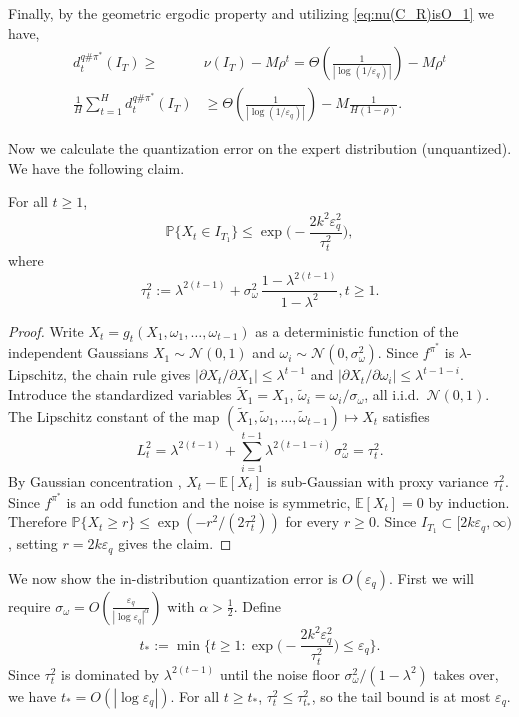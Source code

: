 \documentclass{article}
\begin{document}
Finally, by the geometric ergodic property and utilizing \cref{eq:nu(C_R)isO_1} we have,
\begin{align*}
    d^{q\#\pi^*}_t(I_T)\geq &\nu(I_T)-M\rho^t=\Theta(\frac{1}{|\log(1/\varepsilon_q)|})-M\rho^t\\
    \frac{1}{H}\sum_{t=1}^Hd^{q\#\pi^*}_t(I_T)&\geq \Theta(\frac{1}{|\log(1/\varepsilon_q)|}) - M\frac{1}{H(1-\rho)}.
\end{align*}

Now we calculate the quantization error on the expert distribution (unquantized). We have the following claim.


\begin{claim}\label{claim:tail_bound}
For all $t\ge 1$,
\begin{equation}\label{eq:geometric_decay_bound}
\mathbb P\{X_t\in I_{T_1}\}\leq \exp\Big(-\frac{2k^2\varepsilon_q^2}{\tau_t^2}\Big),
\end{equation}
where
\begin{equation*}
    \tau_t^2:=\lambda^{2(t-1)}+\sigma_{\omega}^2\,\frac{1-\lambda^{2(t-1)}}{1-\lambda^2},t\ge 1.
\end{equation*}
\end{claim}

\begin{proof}
Write $X_t = g_t(X_1,\omega_1,\dots,\omega_{t-1})$ as a deterministic function of the independent Gaussians $X_1\sim\mathcal N(0,1)$ and $\omega_i\sim\mathcal N(0,\sigma_{\omega}^2)$.
Since $f^{\pi^*}$ is $\lambda$-Lipschitz, the chain rule gives
$|\partial X_t/\partial X_1|\le \lambda^{t-1}$ and $|\partial X_t/\partial \omega_i|\le \lambda^{t-1-i}$.
Introduce the standardized variables $\tilde X_1 = X_1$, $\tilde\omega_i = \omega_i/\sigma_{\omega}$, all i.i.d.\ $\mathcal N(0,1)$.
The Lipschitz constant of the map $(\tilde X_1,\tilde\omega_1,\dots,\tilde\omega_{t-1})\mapsto X_t$ satisfies
\[
L_t^2 = \lambda^{2(t-1)} + \sum_{i=1}^{t-1}\lambda^{2(t-1-i)}\,\sigma_{\omega}^2 = \tau_t^2.
\]
By Gaussian concentration , $X_t - \mathbb E[X_t]$ is sub-Gaussian with proxy variance $\tau_t^2$.
Since $f^{\pi^*}$ is an odd function and the noise is symmetric, $\mathbb E[X_t]=0$ by induction.
Therefore $\mathbb P\{X_t\ge r\}\le\exp(-r^2/(2\tau_t^2))$ for every $r\ge 0$.
Since $I_{T_1}\subset[2k\varepsilon_q,\infty)$, setting $r=2k\varepsilon_q$ gives the claim.
\end{proof}

We now show the in-distribution quantization error is $O(\varepsilon_q)$. First we will require $\sigma_\omega=O(\frac{\varepsilon_q}{|\log\varepsilon_q|^{\alpha}})$ with $\alpha>\frac{1}{2}$. Define
\begin{equation*}
    t_*:=\min\Big\{t\ge 1:\exp\Big(-\frac{2k^2\varepsilon_q^2}{\tau_t^2}\Big)\le \varepsilon_q\Big\}.
\end{equation*}
Since $\tau_t^2$ is dominated by $\lambda^{2(t-1)}$ until the noise floor $\sigma_{\omega}^2/(1-\lambda^2)$ takes over, we have $t_*=O(|\log\varepsilon_q|)$.
For all $t\ge t_*$, $\tau_t^2\le \tau_{t_*}^2$, so the tail bound is at most $\varepsilon_q$.
\end{document}
